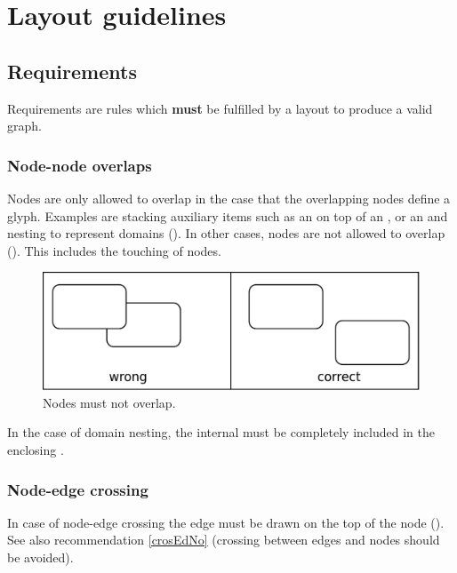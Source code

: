 \newpage

\section{Layout guidelines}

\subsection{Requirements}

Requirements are rules which \textbf{must} be fulfilled by a layout to produce a valid \SBGNERLone graph.

\subsubsection{Node-node overlaps}

Nodes are only allowed to overlap in the case that the overlapping nodes define a glyph. Examples are stacking auxiliary items such as an  on top of an , or an  and nesting  to represent domains (). In other cases, nodes are not allowed to overlap (). This includes the touching of nodes. 

\begin{figure}[!htb]
  \centering
  \includegraphics[scale=0.3]{images/layout-node-node}
  \caption{Nodes must not overlap.}\label{fig:layout1}
\end{figure}

In the case of domain nesting, the internal  must be completely included in the enclosing .

\subsubsection{Node-edge crossing}\label{crosEdNoRe}

In case of node-edge crossing the edge must be drawn on the top of the node (). See also recommendation \ref{crosEdNo} (crossing between edges and nodes should be avoided).


